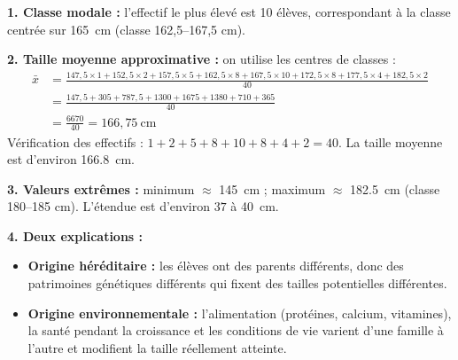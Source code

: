 \documentclass[11pt]{article}
\begin{document}
\begin{corrige}
\textbf{1. Classe modale :} l'effectif le plus élevé est 10 élèves, correspondant à la classe centrée sur \SI{165}{cm} (classe 162,5–167,5 cm).

\textbf{2. Taille moyenne approximative :} on utilise les centres de classes :
\begin{align*}
\bar{x} &= \frac{147{,}5\times 1 + 152{,}5\times 2 + 157{,}5\times 5 + 162{,}5\times 8 + 167{,}5\times 10 + 172{,}5\times 8 + 177{,}5\times 4 + 182{,}5\times 2}{40}\\
&= \frac{147{,}5 + 305 + 787{,}5 + 1300 + 1675 + 1380 + 710 + 365}{40}\\
&= \frac{6670}{40} = 166{,}75\ \text{cm}
\end{align*}
Vérification des effectifs : $1+2+5+8+10+8+4+2 = 40$. La taille moyenne est d'environ \SI{166,8}{cm}.

\textbf{3. Valeurs extrêmes :} minimum $\approx$ \SI{145}{cm} ; maximum $\approx$ \SI{182,5}{cm} (classe 180–185 cm). L'étendue est d'environ $37$ à \SI{40}{cm}.

\textbf{4. Deux explications :}
\begin{itemize}
    \item \textbf{Origine héréditaire :} les élèves ont des parents différents, donc des patrimoines génétiques différents qui fixent des tailles potentielles différentes.
    \item \textbf{Origine environnementale :} l'alimentation (protéines, calcium, vitamines), la santé pendant la croissance et les conditions de vie varient d'une famille à l'autre et modifient la taille réellement atteinte.
\end{itemize}
\end{corrige}
\end{document}
